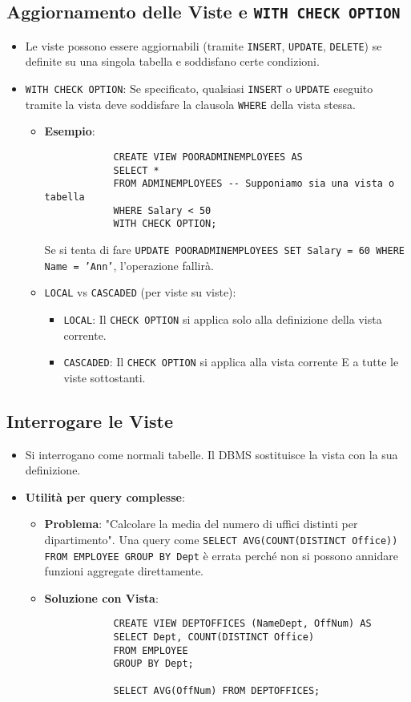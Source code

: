 \documentclass{article}
\begin{document}
	\subsection{Aggiornamento delle Viste e \texttt{WITH CHECK OPTION}}
	\begin{itemize}
		\item Le viste possono essere aggiornabili (tramite \texttt{INSERT}, \texttt{UPDATE}, \texttt{DELETE}) se definite su una singola tabella e soddisfano certe condizioni.
		\item \texttt{WITH CHECK OPTION}: Se specificato, qualsiasi \texttt{INSERT} o \texttt{UPDATE} eseguito tramite la vista deve soddisfare la clausola \texttt{WHERE} della vista stessa.
		\begin{itemize}
			\item \textbf{Esempio}:
			\begin{verbatim}
			CREATE VIEW POORADMINEMPLOYEES AS
			SELECT *
			FROM ADMINEMPLOYEES -- Supponiamo sia una vista o tabella
			WHERE Salary < 50
			WITH CHECK OPTION;
			\end{verbatim}
			Se si tenta di fare \texttt{UPDATE POORADMINEMPLOYEES SET Salary = 60 WHERE Name = 'Ann'}, l'operazione fallirà.
			\item \texttt{LOCAL} vs \texttt{CASCADED} (per viste su viste):
			\begin{itemize}
				\item \texttt{LOCAL}: Il \texttt{CHECK OPTION} si applica solo alla definizione della vista corrente.
				\item \texttt{CASCADED}: Il \texttt{CHECK OPTION} si applica alla vista corrente E a tutte le viste sottostanti.
			\end{itemize}
		\end{itemize}
	\end{itemize}
	
	\subsection{Interrogare le Viste}
	\begin{itemize}
		\item Si interrogano come normali tabelle. Il DBMS sostituisce la vista con la sua definizione.
		\item \textbf{Utilità per query complesse}:
		\begin{itemize}
			\item \textbf{Problema}: "Calcolare la media del numero di uffici distinti per dipartimento". Una query come \texttt{SELECT AVG(COUNT(DISTINCT Office)) FROM EMPLOYEE GROUP BY Dept} è errata perché non si possono annidare funzioni aggregate direttamente.
			\item \textbf{Soluzione con Vista}:
			\begin{verbatim}
			CREATE VIEW DEPTOFFICES (NameDept, OffNum) AS
			SELECT Dept, COUNT(DISTINCT Office)
			FROM EMPLOYEE
			GROUP BY Dept;
		
			SELECT AVG(OffNum) FROM DEPTOFFICES;
			\end{verbatim}
		\end{itemize}
	\end{itemize}
	
\end{document}
